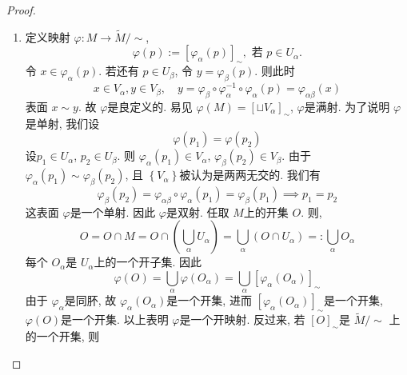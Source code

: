 \documentclass[../main.tex]{subfiles}
\begin{document}
\begin{proof}
\begin{enumerate}
\begin{enumerate}
        若 \(  x\sim y  \), \(  y\sim z  \). 则 \[
        \exists \alpha ,\beta , \gamma ,s.t. x\in V_{\alpha }, y \in V_{\beta }, z \in V_{ \gamma }\text{ 且 } y=  \varphi _{\alpha \beta }\left( x \right), z=  \varphi _{\beta  \gamma }\left( y \right)  
        \]  此时我们有 \[
        x\in V_{\alpha },z \in V_{ \gamma },\text{ 且 } z=  \varphi _{\beta  \gamma }\circ  \varphi _{\alpha \beta }\left( x \right)=  \varphi _{\alpha  \gamma }\left( x \right)  
        \]这表明 \(  x \sim z  \). 最终我们得到 \(  \sim   \)上一个等价关系.  
        \item 定义映射 \( \varphi :M\to \tilde{M}/\sim  \), \[
         \varphi \left( p\right):=  [ \varphi _{\alpha }\left( p \right) ]_{\sim },\text{ 若 }  p\in U_{\alpha }  . 
        \] 令 \(  x \in  \varphi _{\alpha }\left( p \right)   \). 若还有 \(  p \in U_{\beta }  \), 令 \(  y=  \varphi _{\beta }\left( p \right)   \). 则此时 \[
        x\in V_{\alpha }, y\in V_{\beta },\quad y=   \varphi _{\beta }\circ  \varphi _{\alpha }^{-1} \circ \varphi _{\alpha }\left( p \right)=  \varphi _{\alpha \beta }\left( x \right)  
        \]  表面 \(  x\sim y  \). 故 \(   \varphi   \)是良定义的.   易见 \(   \varphi \left( M \right)   = [\sqcup   V_{\alpha }]_{\sim }\), \(   \varphi   \)是满射.  为了说明 \(   \varphi   \)是单射, 我们设 \[
         \varphi \left( p_1 \right)=  \varphi \left( p_2 \right)  
        \] 设\(  p_1\in U_{\alpha }  \), \(  p_2\in U_{\beta }  \). 则 \(   \varphi _{\alpha }\left( p_1 \right)\in V_{\alpha }   \), \(   \varphi _{\beta }\left( p_2 \right)\in V_{\beta }   \).  由于 \(   \varphi _{\alpha }\left( p_1 \right)\sim  \varphi _{\beta }\left( p_2 \right)    \), 且 \(  \left\{ V_{\alpha } \right\}  \)被认为是两两无交的.  我们有 \[
         \varphi _{\beta }\left( p_2 \right)=  \varphi _{\alpha \beta }\circ  \varphi _{\alpha }\left( p_1 \right)=    \varphi _{\beta }\left( p_1 \right)\implies p_1= p_2 
        \]   这表面 \(   \varphi   \)是一个单射. 因此 \(   \varphi   \)是双射. 任取 \(  M  \)上的开集 \(  O  \).     则, \[
        O= O\cap M= O\cap \left( \bigcup _{\alpha }U_{\alpha } \right)= \bigcup _{\alpha }\left( O\cap U_{\alpha } \right)= : \bigcup _{\alpha }O_{\alpha }  
        \]每个 \(  O_{\alpha }  \)是 \(  U_{\alpha }  \)上的一个开子集. 因此 \[
         \varphi \left( O \right)= \bigcup _{\alpha } \varphi \left( O_{\alpha } \right)= \bigcup _{\alpha }[  \varphi _{\alpha }\left( O_{\alpha } \right) ]_{\sim }  
        \]  由于 \(   \varphi _{\alpha }  \)是同肧, 故 \(   \varphi _{\alpha }\left( O_{\alpha } \right)   \)是一个开集, 进而 \(  [ \varphi _{\alpha }\left( O_{\alpha } \right) ]_{\sim }  \)是一个开集,  \(   \varphi \left( O \right)   \)是一个开集. 以上表明 \(   \varphi   \)是一个开映射. 反过来, 若 \(  [O]_{\sim }  \)是 \(  \tilde{M}/\sim   \)       上的一个开集, 则 \[
\]
\end{enumerate}
\end{enumerate}
\end{proof}
\end{document}
